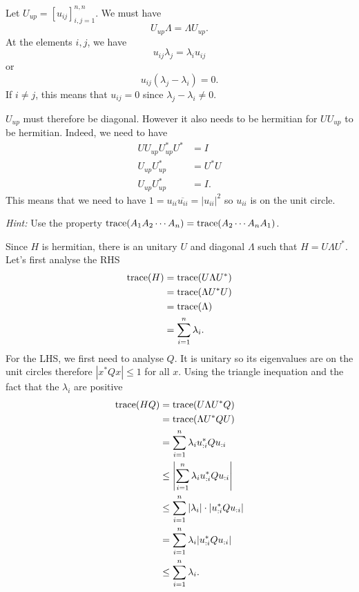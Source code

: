 \begin{solution}
  Let $U_{up} = [u_{ij}]_{i,j=1}^{n,n}$.
  We must have
  \[ U_{up}\Lambda = \Lambda U_{up}. \]
  At the elements $i,j$, we have
  \[ u_{ij} \lambda_j = \lambda_i u_{ij} \]
  or
  \[ u_{ij} (\lambda_j - \lambda_i) = 0. \]
  If $i \neq j$, this means that $u_{ij} = 0$ since $\lambda_j - \lambda_i \neq 0$.

  $U_{up}$ must therefore be diagonal.
  However it also needs to be hermitian for $UU_{up}$ to be hermitian.
  Indeed, we need to have
  \begin{align*}
    UU_{up} U_{up}^*U^* & = I\\
    U_{up} U_{up}^* & = U^*U\\
    U_{up} U_{up}^* & = I.
  \end{align*}
  This means that we need to have $1 = u_{ii}\overline{u_{ii}} = |u_{ii}|^2$
  so $u_{ii}$ is on the unit circle.
\end{solution}

\begin{solution}
  \emph{Hint:}
  Use the property $\operatorname{trace}(A_1A_2 \cdots A_n) = \operatorname{trace}(A_2 \cdots A_nA_1)$.

  Since $H$ is hermitian, there is an unitary $U$ and diagonal $\Lambda$ such that $H = U \Lambda U^*$.
  Let's first analyse the RHS
  \begin{align*}
    \operatorname{trace}(H) & = \operatorname{trace}(U \Lambda U^*)\\
              & = \operatorname{trace}(\Lambda U^*U)\\
              & = \operatorname{trace}(\Lambda)\\
              & = \sum_{i=1}^n \lambda_i.
  \end{align*}
  For the LHS, we first need to analyse $Q$.
  It is unitary so its eigenvalues are on the unit circles therefore $|x^* Q x| \leq 1$ for all $x$.
  Using the triangle inequation and the fact that the $\lambda_i$ are positive
  \begin{align*}
    \operatorname{trace}(HQ)
    & = \operatorname{trace}(U \Lambda U^* Q)\\
    & = \operatorname{trace}(\Lambda U^* Q U)\\
    & = \sum_{i=1}^n \lambda_i u_{:i}^* Q u_{:i}\\
    & \leq \left|\sum_{i=1}^n \lambda_i u_{:i}^* Q u_{:i}\right|\\
    & \leq \sum_{i=1}^n |\lambda_i| \cdot |u_{:i}^* Q u_{:i}|\\
    & = \sum_{i=1}^n \lambda_i |u_{:i}^* Q u_{:i}|\\
    & \leq \sum_{i=1}^n \lambda_i.
  \end{align*}
\end{solution}

